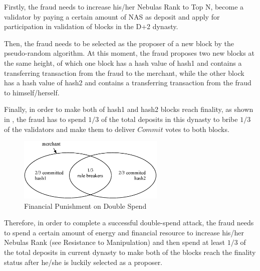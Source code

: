Firstly, the fraud needs to increase his/her Nebulas Rank to Top N, become a validator by paying a certain amount of NAS as deposit and apply for participation in validation of blocks in the D+2 dynasty. 


Then, the fraud needs to be selected as the proposer of a new block by the pseudo-random algorithm. At this moment, the fraud proposes two new blocks at the same height, of which one block has a hash value of hash1 and contains a transferring transaction from the fraud to the merchant, while the other block has a hash value of hash2 and contains a transferring transaction from the fraud to himself/herself. 


Finally, in order to make both of hash1 and hash2 blocks reach finality, as shown in , the fraud has to spend $1/3$ of the total deposits in this dynasty to bribe $1/3$ of the validators and make them to deliver $Commit$ votes to both blocks.


\begin{figure}[h]
\centering
\includegraphics[width=7cm]{./figs/overlap}
\caption{Financial Punishment on Double Spend}
\label{fig:double_spend}
\end{figure}

Therefore, in order to complete a successful double-spend attack, the fraud needs to spend a certain amount of energy and financial resource to increase his/her Nebulas Rank (see  Resistance to Manipulation) and then spend at least $1/3$ of the total deposits in current dynasty to make both of the blocks reach the finality status after he/she is luckily selected as a proposer.

